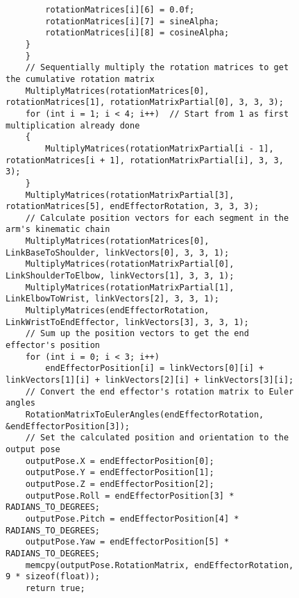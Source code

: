 \begin{figure}[H]
	\centering
	\begin{verbatim}
		rotationMatrices[i][6] = 0.0f;
        rotationMatrices[i][7] = sineAlpha;
        rotationMatrices[i][8] = cosineAlpha;
    }
	}
	// Sequentially multiply the rotation matrices to get the cumulative rotation matrix
	MultiplyMatrices(rotationMatrices[0], rotationMatrices[1], rotationMatrixPartial[0], 3, 3, 3);
	for (int i = 1; i < 4; i++)  // Start from 1 as first multiplication already done
	{
		MultiplyMatrices(rotationMatrixPartial[i - 1], rotationMatrices[i + 1], rotationMatrixPartial[i], 3, 3, 3);
	}
	MultiplyMatrices(rotationMatrixPartial[3], rotationMatrices[5], endEffectorRotation, 3, 3, 3);
	// Calculate position vectors for each segment in the arm's kinematic chain
	MultiplyMatrices(rotationMatrices[0], LinkBaseToShoulder, linkVectors[0], 3, 3, 1);
	MultiplyMatrices(rotationMatrixPartial[0], LinkShoulderToElbow, linkVectors[1], 3, 3, 1);
	MultiplyMatrices(rotationMatrixPartial[1], LinkElbowToWrist, linkVectors[2], 3, 3, 1);
	MultiplyMatrices(endEffectorRotation, LinkWristToEndEffector, linkVectors[3], 3, 3, 1);
	// Sum up the position vectors to get the end effector's position
	for (int i = 0; i < 3; i++)
		endEffectorPosition[i] = linkVectors[0][i] + linkVectors[1][i] + linkVectors[2][i] + linkVectors[3][i];
	// Convert the end effector's rotation matrix to Euler angles
	RotationMatrixToEulerAngles(endEffectorRotation, &endEffectorPosition[3]);
	// Set the calculated position and orientation to the output pose
	outputPose.X = endEffectorPosition[0];
	outputPose.Y = endEffectorPosition[1];
	outputPose.Z = endEffectorPosition[2];
	outputPose.Roll = endEffectorPosition[3] * RADIANS_TO_DEGREES;
	outputPose.Pitch = endEffectorPosition[4] * RADIANS_TO_DEGREES;
	outputPose.Yaw = endEffectorPosition[5] * RADIANS_TO_DEGREES;
	memcpy(outputPose.RotationMatrix, endEffectorRotation, 9 * sizeof(float));
	return true;
	\end{verbatim}
\end{figure}


\newpage
{}


